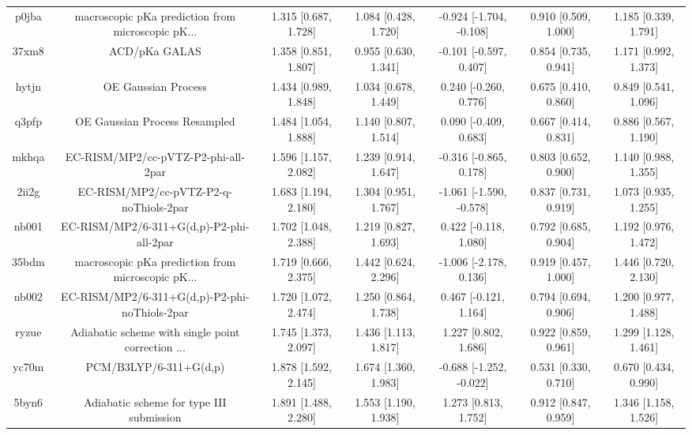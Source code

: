 \documentclass{article}
\begin{document}
\begin{center}
\begin{longtable}{|ccccccc|}
 p0jba &  macroscopic pKa prediction from microscopic pK... &  1.315 [0.687, 1.728] &  1.084 [0.428, 1.720] &  -0.924 [-1.704, -0.108] &  0.910 [0.509, 1.000] &   1.185 [0.339, 1.791] \\
 37xm8 &                                      ACD/pKa GALAS &  1.358 [0.851, 1.807] &  0.955 [0.630, 1.341] &   -0.101 [-0.597, 0.407] &  0.854 [0.735, 0.941] &   1.171 [0.992, 1.373] \\
 hytjn &                                OE Gaussian Process &  1.434 [0.989, 1.848] &  1.034 [0.678, 1.449] &    0.240 [-0.260, 0.776] &  0.675 [0.410, 0.860] &   0.849 [0.541, 1.096] \\
 q3pfp &                      OE Gaussian Process Resampled &  1.484 [1.054, 1.888] &  1.140 [0.807, 1.514] &    0.090 [-0.409, 0.683] &  0.667 [0.414, 0.831] &   0.886 [0.567, 1.190] \\
 mkhqa &                EC-RISM/MP2/cc-pVTZ-P2-phi-all-2par &  1.596 [1.157, 2.082] &  1.239 [0.914, 1.647] &   -0.316 [-0.865, 0.178] &  0.803 [0.652, 0.900] &   1.140 [0.988, 1.355] \\
 2ii2g &             EC-RISM/MP2/cc-pVTZ-P2-q-noThiols-2par &  1.683 [1.194, 2.180] &  1.304 [0.951, 1.767] &  -1.061 [-1.590, -0.578] &  0.837 [0.731, 0.919] &   1.073 [0.935, 1.255] \\
 nb001 &           EC-RISM/MP2/6-311+G(d,p)-P2-phi-all-2par &  1.702 [1.048, 2.388] &  1.219 [0.827, 1.693] &    0.422 [-0.118, 1.080] &  0.792 [0.685, 0.904] &   1.192 [0.976, 1.472] \\
 35bdm &  macroscopic pKa prediction from microscopic pK... &  1.719 [0.666, 2.375] &  1.442 [0.624, 2.296] &   -1.006 [-2.178, 0.136] &  0.919 [0.457, 1.000] &   1.446 [0.720, 2.130] \\
 nb002 &      EC-RISM/MP2/6-311+G(d,p)-P2-phi-noThiols-2par &  1.720 [1.072, 2.474] &  1.250 [0.864, 1.738] &    0.467 [-0.121, 1.164] &  0.794 [0.694, 0.906] &   1.200 [0.977, 1.488] \\
 ryzue &  Adiabatic scheme with single point correction ... &  1.745 [1.373, 2.097] &  1.436 [1.113, 1.817] &     1.227 [0.802, 1.686] &  0.922 [0.859, 0.961] &   1.299 [1.128, 1.461] \\
 yc70m &                             PCM/B3LYP/6-311+G(d,p) &  1.878 [1.592, 2.145] &  1.674 [1.360, 1.983] &  -0.688 [-1.252, -0.022] &  0.531 [0.330, 0.710] &   0.670 [0.434, 0.990] \\
 5byn6 &           Adiabatic scheme for type III submission &  1.891 [1.488, 2.280] &  1.553 [1.190, 1.938] &     1.273 [0.813, 1.752] &  0.912 [0.847, 0.959] &   1.346 [1.158, 1.526] \\

\end{longtable}
\end{center}
\end{document}
